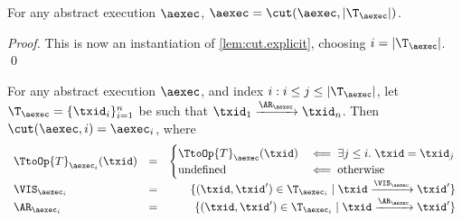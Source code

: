 \begin{proposition}
\label{prop:aexec.inductive}
For any abstract execution $\aexec$, $\aexec = \cut(\aexec, \lvert \T_{\aexec} \rvert)$.
\end{proposition}
\begin{proof}
    This is now an instantiation of \cref{lem:cut.explicit}, choosing $i = \lvert \T_{\aexec} \rvert$. \qed
\end{proof}

\begin{lemma}
\label{lem:cut.explicit}
For any abstract execution $\aexec$, and index $i: i \leq j \leq \lvert \T_{\aexec} \rvert$, 
let $\T_{\aexec} = \{\txid_{i}\}_{i=1}^{n}$ be such that $\txid_{1} \xrightarrow{\AR_{\aexec}}
\txid_{n}$. Then $\cut(\aexec, i) = \aexec_{i}$, where 
\[
\begin{array}{lcr}
\TtoOp{T}_{\aexec_{i}}(\txid) &=& 
\begin{cases}
\TtoOp{T}_{\aexec}(\txid) &\impliedby \exists j \leq i.\; \txid = \txid_{j}\\
\text{undefined} &\impliedby \text{otherwise}\\
\end{cases}
\\
\VIS_{\aexec_{i}} &=& \{ (\txid, \txid') \in \T_{\aexec_{i}} \mid \txid \xrightarrow{\VIS_{\aexec}} \txid'\}\\
\AR_{\aexec_{i}} &=& \{ (\txid, \txid') \in \T_{\aexec_{i}} \mid \txid \xrightarrow{\AR_{\aexec}} \txid'\}
\end{array}
\]
\end{lemma}

